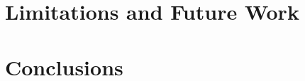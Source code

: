 \documentclass[11pt]{article}
\begin{document}
\section{Limitations and Future Work}
\label{sec:limitations}

\newpage

\section{Conclusions}
\label{sec:conclusions}

\newpage

{}
\begingroup
\raggedright
\nocite{*}


\endgroup
\newpage


\end{document}
